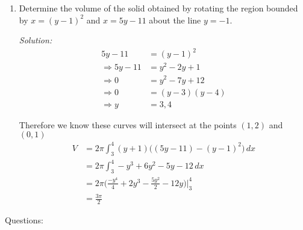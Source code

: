\documentclass[16pt]{article}
\theoremstyle{remark}
\begin{document}
\begin{enumerate}
\item Determine the volume of the solid obtained by rotating the region bounded by 
$x=(y-1)^2$ and $x=5y-11$ about the line $y=-1$.
\begin{mdframed}[style=TheoremFrame]
\textit{Solution:}
\begin{align*}
5y-11 &= (y-1)^2\\
\Rightarrow 5y-11 &= y^2 - 2y + 1\\
\Rightarrow 0 &=  y^2 - 7y + 12\\
\Rightarrow 0 &= (y-3)(y-4)\\
\Rightarrow y&= 3,4
\end{align*}

Therefore we know these curves will intersect at the points $(1,2)$ and $(0,1)$
\begin{align*}
V &= 2\pi \int_3^4 (y+1) \big((5y-11)-(y-1)^2\big) \, dx\\
&=  2\pi \int_3^4 -y^3 + 6y^2 - 5y -12 \, dx\\
&= 2\pi \bigg( \frac{-y^4}{4} + 2y^3 - \frac{5y^2}{2} - 12y \bigg) \bigg|_3^4\\
&= \frac{3\pi}{2}
\end{align*}
\end{mdframed}
\end{enumerate}
\newpage
Questions:
\end{document}
